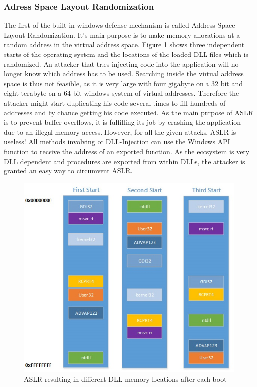 \subsubsection{Adress Space Layout Randomization}
The first of the built in windows defense mechanism is called Address Space Layout Randomization. It's main purpose is to make memory allocations at a random address in the virtual address space. Figure \ref{fig:aslr} shows three independent starts of the operating system and the locations of the loaded DLL files which is randomized. An attacker that tries injecting code into the application will no longer know which address has to be used. Searching inside the virtual address space is thus not feasible, as it is very large with four gigabyte on a 32 bit and eight terabyte on a 64 bit windows system of virtual addresses. Therefore the attacker might start duplicating his code several times to fill hundreds of addresses and by chance getting his code executed. As the main purpose of ASLR is to prevent buffer overflows, it is fulfilling its job by crashing the application due to an illegal memory access. However, for all the given attacks, ASLR is useless! All methods involving  or DLL-Injection can use the Windows API function  to receive the address of an exported function. As the ecosystem is very DLL dependent and procedures are exported from within DLLs, the attacker is granted an easy way to circumvent ASLR.
\begin{figure}
\centering
\includegraphics[width=\textwidth,height=\textheight,keepaspectratio]{sections/background/defenses/aslr.jpg}
\caption{ASLR resulting in different DLL memory locations after each boot}
\label{fig:aslr}
\end{figure}